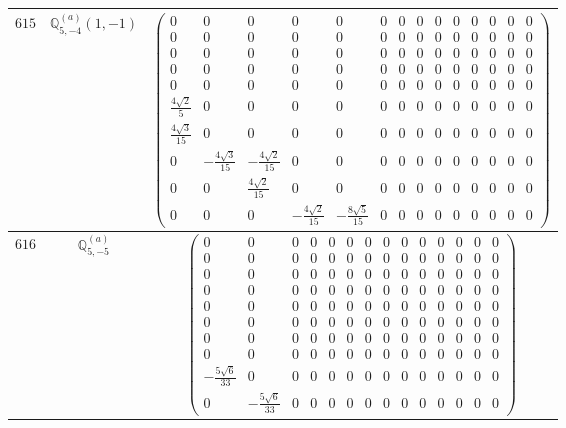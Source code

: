 \documentclass[fleqn,8pt,landscape]{jsarticle}
\begin{document}
\begin{center}
\begin{longtable}{ccc}
$ 615 $ & $ \mathbb{Q}_{5,-4}^{(a)}(1,-1) $ & $ \begin{pmatrix} 0 & 0 & 0 & 0 & 0 & 0 & 0 & 0 & 0 & 0 & 0 & 0 & 0 & 0 \\ 0 & 0 & 0 & 0 & 0 & 0 & 0 & 0 & 0 & 0 & 0 & 0 & 0 & 0 \\ 0 & 0 & 0 & 0 & 0 & 0 & 0 & 0 & 0 & 0 & 0 & 0 & 0 & 0 \\ 0 & 0 & 0 & 0 & 0 & 0 & 0 & 0 & 0 & 0 & 0 & 0 & 0 & 0 \\ 0 & 0 & 0 & 0 & 0 & 0 & 0 & 0 & 0 & 0 & 0 & 0 & 0 & 0 \\ \frac{4 \sqrt{2}}{5} & 0 & 0 & 0 & 0 & 0 & 0 & 0 & 0 & 0 & 0 & 0 & 0 & 0 \\ \frac{4 \sqrt{3}}{15} & 0 & 0 & 0 & 0 & 0 & 0 & 0 & 0 & 0 & 0 & 0 & 0 & 0 \\ 0 & - \frac{4 \sqrt{3}}{15} & - \frac{4 \sqrt{2}}{15} & 0 & 0 & 0 & 0 & 0 & 0 & 0 & 0 & 0 & 0 & 0 \\ 0 & 0 & \frac{4 \sqrt{2}}{15} & 0 & 0 & 0 & 0 & 0 & 0 & 0 & 0 & 0 & 0 & 0 \\ 0 & 0 & 0 & - \frac{4 \sqrt{2}}{15} & - \frac{8 \sqrt{5}}{15} & 0 & 0 & 0 & 0 & 0 & 0 & 0 & 0 & 0 \end{pmatrix} $ \\ \hline
$ 616 $ & $ \mathbb{Q}_{5,-5}^{(a)} $ & $ \begin{pmatrix} 0 & 0 & 0 & 0 & 0 & 0 & 0 & 0 & 0 & 0 & 0 & 0 & 0 & 0 \\ 0 & 0 & 0 & 0 & 0 & 0 & 0 & 0 & 0 & 0 & 0 & 0 & 0 & 0 \\ 0 & 0 & 0 & 0 & 0 & 0 & 0 & 0 & 0 & 0 & 0 & 0 & 0 & 0 \\ 0 & 0 & 0 & 0 & 0 & 0 & 0 & 0 & 0 & 0 & 0 & 0 & 0 & 0 \\ 0 & 0 & 0 & 0 & 0 & 0 & 0 & 0 & 0 & 0 & 0 & 0 & 0 & 0 \\ 0 & 0 & 0 & 0 & 0 & 0 & 0 & 0 & 0 & 0 & 0 & 0 & 0 & 0 \\ 0 & 0 & 0 & 0 & 0 & 0 & 0 & 0 & 0 & 0 & 0 & 0 & 0 & 0 \\ 0 & 0 & 0 & 0 & 0 & 0 & 0 & 0 & 0 & 0 & 0 & 0 & 0 & 0 \\ - \frac{5 \sqrt{6}}{33} & 0 & 0 & 0 & 0 & 0 & 0 & 0 & 0 & 0 & 0 & 0 & 0 & 0 \\ 0 & - \frac{5 \sqrt{6}}{33} & 0 & 0 & 0 & 0 & 0 & 0 & 0 & 0 & 0 & 0 & 0 & 0 \end{pmatrix} $ \\ \hline

\end{longtable}
\end{center}
\end{document}

